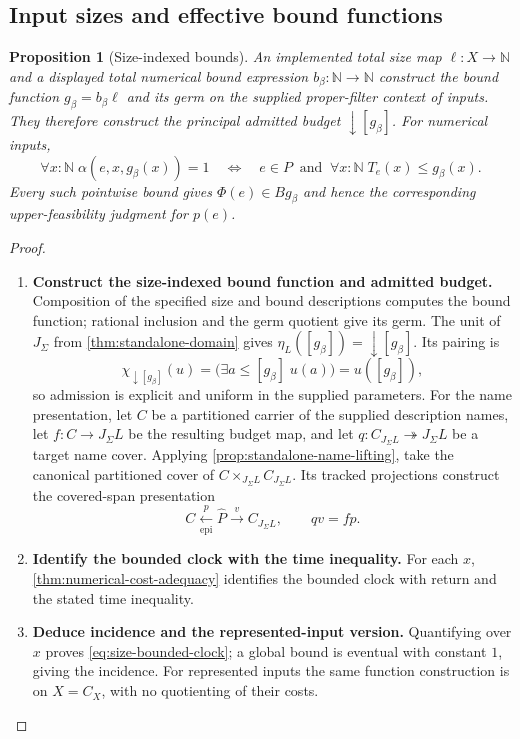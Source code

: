 \documentclass[11pt,a4paper]{article}
\numberwithin{algorithm}{section}
\numberwithin{equation}{section}
\newtheorem{proposition}[proposition]{Proposition}
\theoremstyle{definition}
\theoremstyle{remark}
\theoremstyle{plain}
\newcommand{\N}{\mathbb N}
\newcommand{\J}{J_{\Sigma}}
\newcommand{\onto}{\twoheadrightarrow}
\theoremstyle{definition}
\theoremstyle{plain}
\begin{document}
\subsection{Input sizes and effective bound functions}
\begin{proposition}[Size-indexed bounds]
\label{prop:size-indexed-bounds}
An implemented total size map $\ell:X\to\N$ and a displayed total
numerical bound expression $b_\beta:\N\to\N$ construct the bound
function $g_\beta=b_\beta\ell$ and its germ on the supplied
proper-filter context of inputs. They therefore construct the
principal admitted budget $\downarrow[g_\beta]$. For numerical inputs,
\begin{equation}\label{eq:size-bounded-clock}
 \forall x:\N\;\alpha(e,x,g_\beta(x))=1
 \quad\Longleftrightarrow\quad
 e\in P\ \text{ and }\ \forall x:\N\;T_e(x)\le g_\beta(x).
\end{equation}
Every such pointwise bound gives $\Phi(e)\in B g_\beta$ and hence
the corresponding upper-feasibility judgment for $p(e)$.
\end{proposition}
\begin{proof}\leavevmode
\begin{enumerate}[leftmargin=*,align=left]
\item \textbf{Construct the size-indexed bound function and admitted budget.}
Composition of the specified size and bound descriptions computes the
bound function; rational inclusion and the germ quotient give its
germ. The unit of $\J$ from \cref{thm:standalone-domain} gives
$\eta_L([g_\beta])=\downarrow[g_\beta]$. Its pairing is
\[
 \chi_{\downarrow[g_\beta]}(u)
 =\bigl(\exists a\le[g_\beta]\;u(a)\bigr)=u([g_\beta]),
\]
so admission is explicit and uniform in the supplied parameters.
For the name presentation, let $C$ be a partitioned carrier of the
supplied description names, let $f:C\to\J L$ be the resulting budget
map, and let $q:C_{\J L}\onto\J L$ be a target name cover.
Applying \cref{prop:standalone-name-lifting}, take the canonical
partitioned cover of $C\times_{\J L}C_{\J L}$. Its tracked projections
construct the covered-span presentation
\[
 C\xleftarrow[\mathrm{epi}]{p}\widehat P
   \xrightarrow{v}C_{\J L},\qquad qv=fp.
\]

\item \textbf{Identify the bounded clock with the time inequality.}
For each $x$,
\cref{thm:numerical-cost-adequacy} identifies the bounded clock with
return and the stated time inequality.

\item \textbf{Deduce incidence and the represented-input version.}
Quantifying over $x$ proves
\eqref{eq:size-bounded-clock}; a global bound is eventual with constant
$1$, giving the incidence. For represented inputs the same function
construction is on $X=C_X$, with no quotienting of their costs.
\end{enumerate}
\end{proof}
\end{document}
